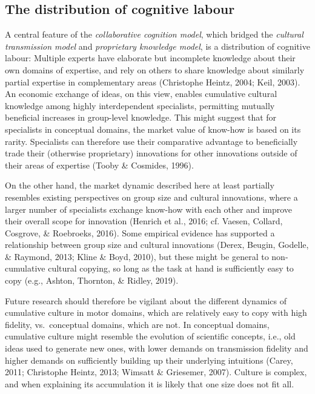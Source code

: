 \documentclass[
  11pt,
]{article}
\begin{document}
\hypertarget{the-distribution-of-cognitive-labour}{%
\subsection{The distribution of cognitive labour}\label{the-distribution-of-cognitive-labour}}

A central feature of the \emph{collaborative cognition model}, which bridged the \emph{cultural transmission model} and \emph{proprietary knowledge model}, is a distribution of cognitive labour: Multiple experts have elaborate but incomplete knowledge about their own domains of expertise, and rely on others to share knowledge about similarly partial expertise in complementary areas (Christophe Heintz, 2004; Keil, 2003). An economic exchange of ideas, on this view, enables cumulative cultural knowledge among highly interdependent specialists, permitting mutually beneficial increases in group-level knowledge. This might suggest that for specialists in conceptual domains, the market value of know-how is based on its rarity. Specialists can therefore use their comparative advantage to beneficially trade their (otherwise proprietary) innovations for other innovations outside of their areas of expertise (Tooby \& Cosmides, 1996).

On the other hand, the market dynamic described here at least partially resembles existing perspectives on group size and cultural innovations, where a larger number of specialists exchange know-how with each other and improve their overall scope for innovation (Henrich et al., 2016; cf. Vaesen, Collard, Cosgrove, \& Roebroeks, 2016). Some empirical evidence has supported a relationship between group size and cultural innovations (Derex, Beugin, Godelle, \& Raymond, 2013; Kline \& Boyd, 2010), but these might be general to non-cumulative cultural copying, so long as the task at hand is sufficiently easy to copy (e.g., Ashton, Thornton, \& Ridley, 2019).

Future research should therefore be vigilant about the different dynamics of cumulative culture in motor domains, which are relatively easy to copy with high fidelity, vs.~conceptual domains, which are not. In conceptual domains, cumulative culture might resemble the evolution of scientific concepts, i.e., old ideas used to generate new ones, with lower demands on transmission fidelity and higher demands on sufficiently building up their underlying intuitions (Carey, 2011; Christophe Heintz, 2013; Wimsatt \& Griesemer, 2007). Culture is complex, and when explaining its accumulation it is likely that one size does not fit all.
\end{document}
